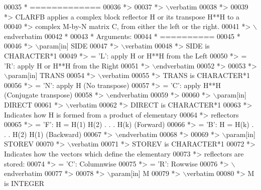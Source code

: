 \begin{DoxyCode}
00035 \textcolor{comment}{*  =============}
00036 \textcolor{comment}{*>}
00037 \textcolor{comment}{*> \(\backslash\)verbatim}
00038 \textcolor{comment}{*>}
00039 \textcolor{comment}{*> CLARFB applies a complex block reflector H or its transpose H**H to a}
00040 \textcolor{comment}{*> complex M-by-N matrix C, from either the left or the right.}
00041 \textcolor{comment}{*> \(\backslash\)endverbatim}
00042 \textcolor{comment}{*}
00043 \textcolor{comment}{*  Arguments:}
00044 \textcolor{comment}{*  ==========}
00045 \textcolor{comment}{*}
00046 \textcolor{comment}{*> \(\backslash\)param[in] SIDE}
00047 \textcolor{comment}{*> \(\backslash\)verbatim}
00048 \textcolor{comment}{*>          SIDE is CHARACTER*1}
00049 \textcolor{comment}{*>          = 'L': apply H or H**H from the Left}
00050 \textcolor{comment}{*>          = 'R': apply H or H**H from the Right}
00051 \textcolor{comment}{*> \(\backslash\)endverbatim}
00052 \textcolor{comment}{*>}
00053 \textcolor{comment}{*> \(\backslash\)param[in] TRANS}
00054 \textcolor{comment}{*> \(\backslash\)verbatim}
00055 \textcolor{comment}{*>          TRANS is CHARACTER*1}
00056 \textcolor{comment}{*>          = 'N': apply H (No transpose)}
00057 \textcolor{comment}{*>          = 'C': apply H**H (Conjugate transpose)}
00058 \textcolor{comment}{*> \(\backslash\)endverbatim}
00059 \textcolor{comment}{*>}
00060 \textcolor{comment}{*> \(\backslash\)param[in] DIRECT}
00061 \textcolor{comment}{*> \(\backslash\)verbatim}
00062 \textcolor{comment}{*>          DIRECT is CHARACTER*1}
00063 \textcolor{comment}{*>          Indicates how H is formed from a product of elementary}
00064 \textcolor{comment}{*>          reflectors}
00065 \textcolor{comment}{*>          = 'F': H = H(1) H(2) . . . H(k) (Forward)}
00066 \textcolor{comment}{*>          = 'B': H = H(k) . . . H(2) H(1) (Backward)}
00067 \textcolor{comment}{*> \(\backslash\)endverbatim}
00068 \textcolor{comment}{*>}
00069 \textcolor{comment}{*> \(\backslash\)param[in] STOREV}
00070 \textcolor{comment}{*> \(\backslash\)verbatim}
00071 \textcolor{comment}{*>          STOREV is CHARACTER*1}
00072 \textcolor{comment}{*>          Indicates how the vectors which define the elementary}
00073 \textcolor{comment}{*>          reflectors are stored:}
00074 \textcolor{comment}{*>          = 'C': Columnwise}
00075 \textcolor{comment}{*>          = 'R': Rowwise}
00076 \textcolor{comment}{*> \(\backslash\)endverbatim}
00077 \textcolor{comment}{*>}
00078 \textcolor{comment}{*> \(\backslash\)param[in] M}
00079 \textcolor{comment}{*> \(\backslash\)verbatim}
00080 \textcolor{comment}{*>          M is INTEGER}

\end{DoxyCode}
